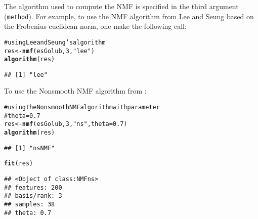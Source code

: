 \documentclass[a4paper]{article}\usepackage{graphicx, color}
\makeatletter
\newcommand{\hlfunctioncall}[1]{\textcolor[rgb]{0.501960784313725,0,0.329411764705882}{\textbf{#1}}}%
\newcommand{\hlstring}[1]{\textcolor[rgb]{0.6,0.6,1}{#1}}%
\newcommand{\hlcomment}[1]{\textcolor[rgb]{0.180392156862745,0.6,0.341176470588235}{#1}}%
\newenvironment{kframe}{%
 \def\at@end@of@kframe{}%
 \ifinner\ifhmode%
  \def\at@end@of@kframe{\end{minipage}}%
  \begin{minipage}{\columnwidth}%
 \fi\fi%
 \def\FrameCommand##1{\hskip\@totalleftmargin \hskip-\fboxsep
 \colorbox{shadecolor}{##1}\hskip-\fboxsep
     \hskip-\linewidth \hskip-\@totalleftmargin \hskip\columnwidth}%
 \MakeFramed {\advance\hsize-\width
   \@totalleftmargin\z@ \linewidth\hsize
   \@setminipage}}%
 {\par\unskip\endMakeFramed%
 \at@end@of@kframe}
\newenvironment{knitrout}{}{} %
\let\code=\texttt
\renewcommand{\cite}[1]{\parencite{#1}}
\makeatother
\begin{document}

The algorithm used to compute the NMF is specified in the third argument (\code{method}). 
For example, to use the NMF algorithm from Lee and Seung \cite{Lee2001} based on
the Frobenius euclidean norm, one make the following call:
\begin{knitrout}
\color{fgcolor}\begin{kframe}
\begin{alltt}
\hlcomment{# using Lee and Seung's algorithm}
res <- \hlfunctioncall{nmf}(esGolub, 3, \hlstring{"lee"})
\hlfunctioncall{algorithm}(res)
\end{alltt}
\begin{verbatim}
## [1] "lee"
\end{verbatim}
\end{kframe}
\end{knitrout}


To use the Nonsmooth NMF algorithm from \cite{Pascual-Montano2006}: 
\begin{knitrout}
\color{fgcolor}\begin{kframe}
\begin{alltt}
\hlcomment{# using the Nonsmooth NMF algorithm with parameter}
\hlcomment{# theta=0.7}
res <- \hlfunctioncall{nmf}(esGolub, 3, \hlstring{"ns"}, theta = 0.7)
\hlfunctioncall{algorithm}(res)
\end{alltt}
\begin{verbatim}
## [1] "nsNMF"
\end{verbatim}
\begin{alltt}
\hlfunctioncall{fit}(res)
\end{alltt}
\begin{verbatim}
## <Object of class:NMFns>
## features: 200 
## basis/rank: 3 
## samples: 38 
## theta: 0.7
\end{verbatim}
\end{kframe}
\end{knitrout}
\end{document}
